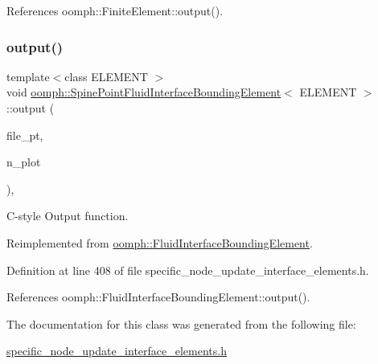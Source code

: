 References oomph\+::\+Finite\+Element\+::output().

\mbox{\label{classoomph_1_1SpinePointFluidInterfaceBoundingElement_a75a530620bfa2a983fec2e1c7f801db2}} 
\subsubsection{\texorpdfstring{output()}{output()}\hspace{0.1cm}{\footnotesize\ttfamily [4/4]}}
{\footnotesize\ttfamily template$<$class E\+L\+E\+M\+E\+NT $>$ \\
void \hyperlink{classoomph_1_1SpinePointFluidInterfaceBoundingElement}{oomph\+::\+Spine\+Point\+Fluid\+Interface\+Bounding\+Element}$<$ E\+L\+E\+M\+E\+NT $>$\+::output (\begin{DoxyParamCaption}\item[{F\+I\+LE $\ast$}]{file\+\_\+pt,  }\item[{const unsigned \&}]{n\+\_\+plot }\end{DoxyParamCaption})\hspace{0.3cm}{\ttfamily [inline]}, {\ttfamily [virtual]}}



C-\/style Output function. 



Reimplemented from \hyperlink{classoomph_1_1FluidInterfaceBoundingElement_ae85ea987a06275a03ad6d0e3710871da}{oomph\+::\+Fluid\+Interface\+Bounding\+Element}.



Definition at line 408 of file specific\+\_\+node\+\_\+update\+\_\+interface\+\_\+elements.\+h.



References oomph\+::\+Fluid\+Interface\+Bounding\+Element\+::output().



The documentation for this class was generated from the following file\+:\begin{DoxyCompactItemize}
\item 
\hyperlink{specific__node__update__interface__elements_8h}{specific\+\_\+node\+\_\+update\+\_\+interface\+\_\+elements.\+h}\end{DoxyCompactItemize}
